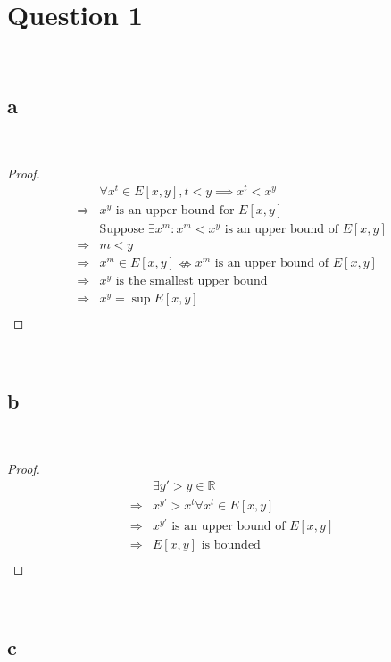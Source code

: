 \documentclass{article}
\begin{document}
\section*{Question 1}

~

\subsection*{a}

~

\begin{proof}
    \begin{align*}
        &\forall x^t\in E[x,y],t<y\implies x^t<x^y\\
        \Rightarrow&x^y\text{ is an upper bound for }E[x,y]\\
        &\text{Suppose }\exists x^m:x^m<x^y\text{ is an upper bound of }E[x,y]\\
        \Rightarrow&m<y\\
        \Rightarrow&x^m\in E[x,y] \nLeftrightarrow x^m \text{ is an upper bound of }E[x,y]\\
        \Rightarrow&x^y\text{ is the smallest upper bound}\\
        \Rightarrow&x^y=\sup E[x,y]\\
    \end{align*}
\end{proof}

~

\subsection*{b}

~

\begin{proof}
    \begin{align*}
        &\exists y'>y\in \mathbb{R} \\
        \Rightarrow&x^{y'}>x^t\forall x^t\in E[x,y]\\
        \Rightarrow&x^{y'}\text{ is an upper bound of }E[x,y]\\
        \Rightarrow&E[x,y]\text{ is bounded}\\
    \end{align*}
\end{proof}

~

\subsection*{c}
\end{document}
